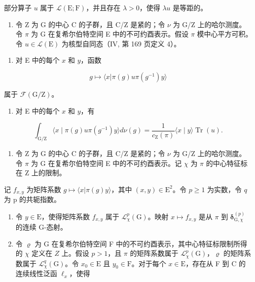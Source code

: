 部分算子 \(u\) 属于 \(\mathcal{L}(\mathrm{E};\mathrm{F})\)，并且存在 \(\lambda > 0\)，使得 \(\lambda u\) 是等距的。

\begin{enumerate}
\def\labelenumi{\arabic{enumi})}
\setcounter{enumi}{13}
\tightlist
\item
  令 Z 为 G 的中心 C 的子群，且 C/Z 是紧的；令 \(\nu\) 为 G/Z 上的哈尔测度。令 \(\pi\) 为 G 在复希尔伯特空间 E 中的不可约酉表示。假设 \(\pi\) 模中心平方可积。令 \(u \in \mathcal{L}(\mathrm{E})\) 为核型自同态（IV, 第 169 页定义 4）。
\end{enumerate}

\begin{enumerate}
\def\labelenumi{\alph{enumi})}
\tightlist
\item
  对 E 中的每个 \(x\) 和 \(y\)，函数
\end{enumerate}

\[
g \mapsto \langle x | \pi (g) u \pi (g ^ {- 1}) y \rangle
\]

属于 \(\mathcal{F}(\mathrm{G / Z})\)。

\begin{enumerate}
\def\labelenumi{\alph{enumi})}
\setcounter{enumi}{1}
\tightlist
\item
  对 E 中的每个 \(x\) 和 \(y\)，有
\end{enumerate}

\[
\int_ {\mathrm{G} / \mathrm{Z}} \langle x \mid \pi (g) u \pi (g ^ {- 1}) y \rangle d \nu (g) = \frac {1}{c _ {\mathrm{Z}} (\pi)} \langle x \mid y \rangle \operatorname{Tr} (u).
\]

\begin{enumerate}
\def\labelenumi{\arabic{enumi})}
\setcounter{enumi}{14}
\tightlist
\item
  令 Z 为 G 的中心 C 的子群，且 C/Z 是紧的；令 \(\nu\) 为 G/Z 上的哈尔测度。令 \(\pi\) 为 G 在复希尔伯特空间 E 中的不可约酉表示。记 \(\chi\) 为 \(\pi\) 的中心特征标在 Z 上的限制。
\end{enumerate}

记 \(f_{x,y}\) 为矩阵系数 \(g \mapsto \langle x | \pi(g)y \rangle\)，其中 \((x, y) \in \mathrm{E}^{2}\)。令 \(p \geqslant 1\) 为实数，令 \(q\) 为 p 的共轭指数。

\begin{enumerate}
\def\labelenumi{\alph{enumi})}
\item
  令 \(y \in \mathrm{E}\)，使得矩阵系数 \(f_{x,y}\) 属于 \(\mathcal{L}_{\chi}^{p}(\mathrm{G})\)。映射 \(x \mapsto f_{x,y}\) 是从 \(\pi\) 到 \(\boldsymbol{\delta}_{\mathrm{G},\chi}^{(p)}\) 的连续 G-态射。
\item
  令 \(\varrho\) 为 G 在复希尔伯特空间 F 中的不可约酉表示，其中心特征标限制所得的 \(\chi\) 定义在 \(Z\) 上。假设 \(p > 1\)，且 \(\pi\) 的矩阵系数属于 \(\mathcal{L}_{\chi}^{p}(\mathrm{G})\)，\(\varrho\) 的矩阵系数属于 \(\mathcal{L}_{\chi}^{q}(\mathrm{G})\)。令 \(x_0 \in \mathrm{E}\) 且 \(y_0 \in \mathrm{F}\)。对于每个 \(x \in \mathrm{E}\)，存在从 F 到 C 的连续线性泛函 \(\ell_x\)，使得
\end{enumerate}

